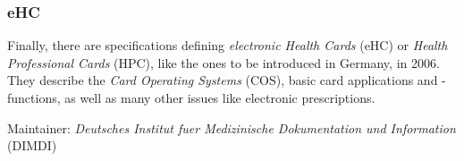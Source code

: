 %
%
%
%
%
%
%

\subsubsection{eHC}
\label{ehc_heading}

Finally, there are specifications defining \emph{electronic Health Cards} (eHC)
or \emph{Health Professional Cards} (HPC), like the ones to be introduced in
Germany, in 2006. \cite{dimdi} They describe the \emph{Card Operating Systems}
(COS), basic card applications and -functions, as well as many other issues
like electronic prescriptions.

Maintainer: \emph{Deutsches Institut fuer Medizinische Dokumentation und Information} (DIMDI)
